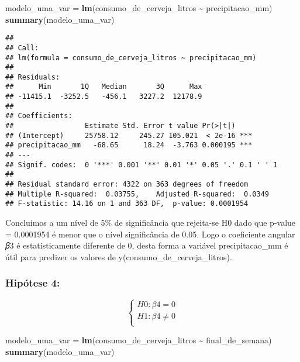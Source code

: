 \documentclass[
]{article}
\newenvironment{Shaded}{\begin{snugshade}}{\end{snugshade}}
\newcommand{\FunctionTok}[1]{\textcolor[rgb]{0.13,0.29,0.53}{\textbf{#1}}}
\newcommand{\NormalTok}[1]{#1}
\newcommand{\OtherTok}[1]{\textcolor[rgb]{0.56,0.35,0.01}{#1}}
\newcommand{\SpecialCharTok}[1]{\textcolor[rgb]{0.81,0.36,0.00}{\textbf{#1}}}
\begin{document}
\begin{Shaded}
\begin{Highlighting}[]
\NormalTok{modelo\_uma\_var }\OtherTok{=} \FunctionTok{lm}\NormalTok{(consumo\_de\_cerveja\_litros }\SpecialCharTok{\textasciitilde{}}\NormalTok{ precipitacao\_mm)}
\FunctionTok{summary}\NormalTok{(modelo\_uma\_var)}
\end{Highlighting}
\end{Shaded}

\begin{verbatim}
## 
## Call:
## lm(formula = consumo_de_cerveja_litros ~ precipitacao_mm)
## 
## Residuals:
##      Min       1Q   Median       3Q      Max 
## -11415.1  -3252.5   -456.1   3227.2  12178.9 
## 
## Coefficients:
##                 Estimate Std. Error t value Pr(>|t|)    
## (Intercept)     25758.12     245.27 105.021  < 2e-16 ***
## precipitacao_mm   -68.65      18.24  -3.763 0.000195 ***
## ---
## Signif. codes:  0 '***' 0.001 '**' 0.01 '*' 0.05 '.' 0.1 ' ' 1
## 
## Residual standard error: 4322 on 363 degrees of freedom
## Multiple R-squared:  0.03755,    Adjusted R-squared:  0.0349 
## F-statistic: 14.16 on 1 and 363 DF,  p-value: 0.0001954
\end{verbatim}

Concluimos a um nível de 5\% de significância que rejeita-se H0 dado que
p-value = 0.0001954 é menor que o nível significância de 0.05. Logo o
coeficiente angular 𝛽3 é estatisticamente diferente de 0, desta forma a
variável precipitacao\_mm é útil para predizer os valores de
y(consumo\_de\_cerveja\_litros).

\hypertarget{hipuxf3tese-4}{%
\subsubsection{Hipótese 4:}\label{hipuxf3tese-4}}

\[
\left\{ \begin{array}{rc} 
H0: \beta4 = 0 \\ 
H1: \beta4 \neq 0 \\ 
\end{array}\right.
\]

\begin{Shaded}
\begin{Highlighting}[]
\NormalTok{modelo\_uma\_var }\OtherTok{=} \FunctionTok{lm}\NormalTok{(consumo\_de\_cerveja\_litros }\SpecialCharTok{\textasciitilde{}}\NormalTok{ final\_de\_semana)}
\FunctionTok{summary}\NormalTok{(modelo\_uma\_var)}
\end{Highlighting}
\end{Shaded}
\end{document}
